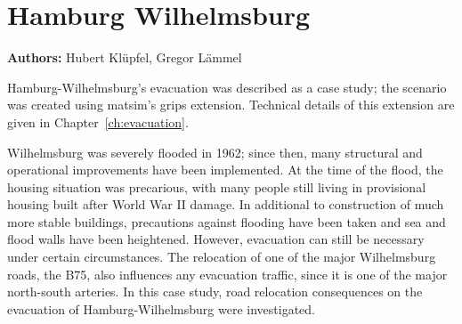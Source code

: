 \section{Hamburg Wilhelmsburg}
\label{ch:sc:hhw}
\hfill \textbf{Authors:} Hubert Klüpfel, Gregor Lämmel


Hamburg-Wilhelmsburg's evacuation was described as a case study; the scenario was created using \gls{matsim}'s \gls{grips} \gls{extension}. Technical details of this extension are given in Chapter~\ref{ch:evacuation}. 

Wilhelmsburg was severely flooded in 1962; since then, many structural and operational improvements have been implemented. At the time of the flood, the housing situation was precarious, with many people still living in provisional housing built after World War II damage. In additional to  construction of much more stable buildings, precautions against flooding have been taken and sea and flood walls have been heightened. However, evacuation can still be necessary under certain circumstances. The relocation of one of the major Wilhelmsburg roads, the B75, also influences any evacuation traffic, since it is one of the major north-south arteries. In this case study, road relocation consequences on the evacuation of Hamburg-Wilhelmsburg were investigated.

